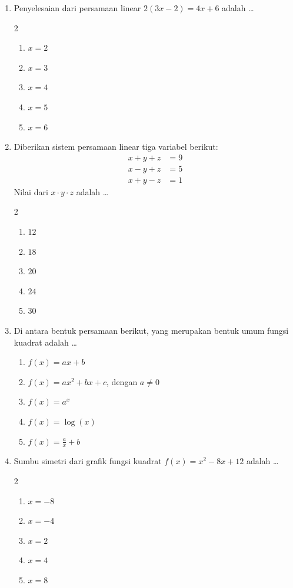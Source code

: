 \documentclass[12pt,a4paper]{article}
\begin{document}
\begin{enumerate}[itemsep=2ex]
    \item Penyelesaian dari persamaan linear $2(3x - 2) = 4x + 6$ adalah \dots
    \begin{multicols}{2}
    \begin{enumerate}[label=\Alph*.]
        \item $x = 2$
        \item $x = 3$
        \item $x = 4$
        \item $x = 5$
        \item $x = 6$
    \end{enumerate}
    \end{multicols}

    \item Diberikan sistem persamaan linear tiga variabel berikut:
    \begin{align*}
        x + y + z &= 9 \\
        x - y + z &= 5 \\
        x + y - z &= 1
    \end{align*}
    Nilai dari $x \cdot y \cdot z$ adalah \dots
    \begin{multicols}{2}
    \begin{enumerate}[label=\Alph*.]
        \item $12$
        \item $18$
        \item $20$
        \item $24$
        \item $30$
    \end{enumerate}
    \end{multicols}

    \item Di antara bentuk persamaan berikut, yang merupakan bentuk umum fungsi kuadrat adalah \dots
    \begin{enumerate}[label=\Alph*.]
        \item $f(x) = ax + b$
        \item $f(x) = ax^2 + bx + c$, dengan $a \neq 0$
        \item $f(x) = a^x$
        \item $f(x) = \log(x)$
        \item $f(x) = \frac{a}{x} + b$
    \end{enumerate}

    \item Sumbu simetri dari grafik fungsi kuadrat $f(x) = x^2 - 8x + 12$ adalah \dots
    \begin{multicols}{2}
    \begin{enumerate}[label=\Alph*.]
        \item $x = -8$
        \item $x = -4$
        \item $x = 2$
        \item $x = 4$
        \item $x = 8$
    \end{enumerate}
    \end{multicols}


\end{enumerate}
\end{document}
